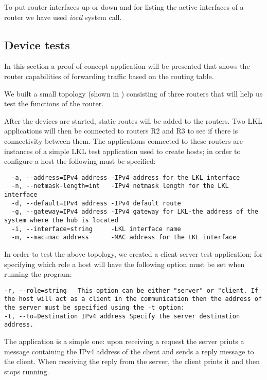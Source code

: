 {{%
To put router interfaces up or down and for listing the active interfaces of a router we have used \textit{ioctl} system call.

\subsection{Device tests}
\label{sub-sec:router-tests}

In this section a proof of concept application will be presented that shows the router capabilities of 
forwarding traffic based on the routing table. 

We built a small topology (shown in ) consisting of three routers that will help us test the functions of the router.

After the devices are started, static routes will be added to the routers. Two LKL applications will 
then be connected to routers R2 and R3 to see if there is connectivity between them. The applications 
connected to these routers are instances of a simple LKL test application used to create hosts; in order 
to configure a host the following must be specified:

\begin{lstlisting}
  -a, --address=IPv4 address -IPv4 address for the LKL interface
  -n, --netmask-length=int   -IPv4 netmask length for the LKL interface
  -d, --default=IPv4 address -IPv4 default route
  -g, --gateway=IPv4 address -IPv4 gateway for LKL-the address of the system where the hub is located
  -i, --interface=string     -LKL interface name
  -m, --mac=mac address      -MAC address for the LKL interface
\end{lstlisting}

\begin{comment}
  -l, --lkl                  -means that this application uses LKL
  -p, --port=int             Port
  -r, --role=string          server/client
  -t, --to=Destination IPv4 address
                             IPv4 destination
\end{comment}
In order to test the above topology, we created a client-server test-application; for specifying which role a host will have the following option must be set when running the program:
\begin{lstlisting}
-r, --role=string   This option can be either "server" or "client. If the host will act as a client in the communication then the address of the server must be specified using the -t option:
-t, --to=Destination IPv4 address Specify the server destination address.
\end{lstlisting} 
The application is a simple one: upon receiving a request the server prints a message containing the 
IPv4 address of the client and sends a reply message to the client. When receiving the reply from the server, the client prints it and then stops running.

}}

